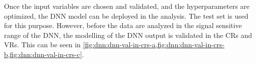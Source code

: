 Once the input variables are chosen and validated, and the hyperparameters are optimized, the DNN model can be deployed in the analysis. The test set is used for this purpose.
However, before the data are analyzed in the signal sensitive range of the DNN, the modelling of the DNN output is validated in the CRs and VRs. This can be seen in \cref{fig:dnn:dnn-val-in-crs-a,fig:dnn:dnn-val-in-crs-b,fig:dnn:dnn-val-in-crs-c}.
\begin{figure}[ht]
    \centering
\end{figure}
